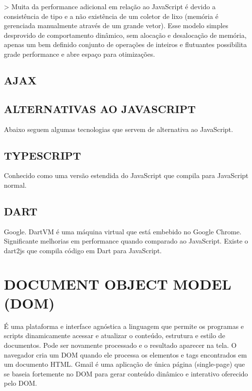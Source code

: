 \documentclass[11pt,a4paper]{article}
\begin{document}
> Muita da performance adicional em relação ao JavaScript é devido
a consistência de tipo e a não existência de um coletor de lixo
(memória é gerenciada manualmente através de um grande vetor). Esse
modelo simples desprovido de comportamento dinâmico, sem alocação
e desalocação de memória, apenas um bem definido conjunto de
operações de inteiros e flutuantes possibilita grade performance e
abre espaço para otimizações.

\subsection{AJAX}

\subsection{ ALTERNATIVAS AO JAVASCRIPT}

Abaixo seguem algumas tecnologias que servem de alternativa ao
JavaScript.

\subsection{TYPESCRIPT}

Conhecido como uma versão estendida do JavaScript que compila para
JavaScript normal.

\subsection{DART}

Google. DartVM é uma máquina virtual que está embebido no Google
Chrome. Significante melhorias em performance quando comparado
ao JavaScript. Existe o dart2js que compila código em Dart para
JavaScript.


\section{ DOCUMENT OBJECT MODEL (DOM)}

É uma plataforma e interface agnóstica a linguagem que permite os
programas e scripts dinamicamente acessar e atualizar o conteúdo,
estrutura e estilo de documentos. Pode ser novamente processado e o
resultado aparecer na tela. O navegador cria um DOM quando ele processa
os elementos e tags encontrados em um documento HTML. Gmail é uma
aplicação de única página (single-page) que se baseia fortemente no
DOM para gerar conteúdo dinâmico e interativo oferecido pelo DOM.
\end{document}
